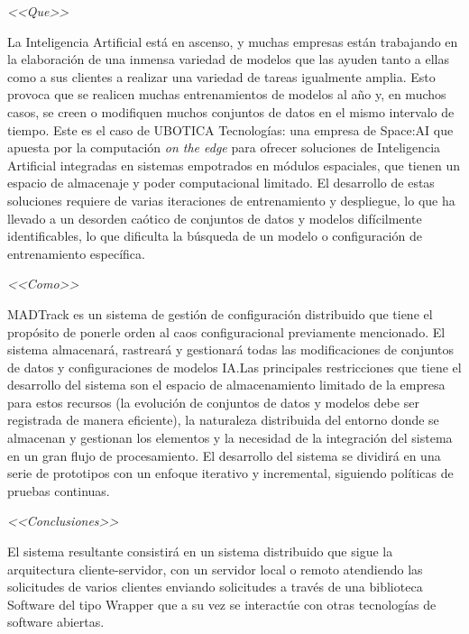 \begin{resumenPral}[spanish]{\titulo} %

\emph{<<Que>>}

La Inteligencia Artificial está en ascenso, y muchas empresas están trabajando en la elaboración de una inmensa variedad de modelos que las ayuden tanto a ellas 
como a sus clientes a realizar una variedad de tareas igualmente amplia. Esto provoca que se realicen muchas entrenamientos de modelos al año y, en muchos casos, 
se creen o modifiquen muchos conjuntos de datos en el mismo intervalo de tiempo. Este es el caso de UBOTICA Tecnologías: una empresa de Space:AI que apuesta por la
computación \emph{on the edge} para ofrecer soluciones de Inteligencia Artificial integradas en sistemas empotrados en módulos espaciales, que tienen un espacio de 
almacenaje y poder computacional limitado. El desarrollo de estas soluciones requiere de varias iteraciones de entrenamiento y despliegue, lo que ha llevado a un desorden
caótico de conjuntos de datos y modelos difícilmente identificables, lo que dificulta la búsqueda de un modelo o configuración de entrenamiento específica. 

\emph{<<Como>>}

MADTrack es un sistema de gestión de configuración distribuido que tiene el propósito de ponerle orden al caos configuracional previamente mencionado. El sistema almacenará, 
rastreará y gestionará todas las modificaciones de conjuntos de datos y configuraciones de modelos IA.Las principales
restricciones que tiene el desarrollo del sistema son el espacio de almacenamiento limitado de la empresa para estos recursos (la evolución de conjuntos de datos y modelos debe ser 
registrada de manera eficiente), la naturaleza distribuida del entorno donde se almacenan y gestionan los elementos y la necesidad de la integración del sistema en un gran flujo de
procesamiento. El desarrollo del sistema se dividirá en una serie de prototipos con un enfoque iterativo y incremental, siguiendo políticas de pruebas continuas.


\emph{<<Conclusiones>>}

El sistema resultante consistirá en un sistema distribuido que sigue la arquitectura cliente-servidor, con un servidor local o remoto atendiendo las solicitudes de varios clientes enviando 
solicitudes a través de una biblioteca Software del tipo Wrapper que a su vez se interactúe con otras tecnologías de software abiertas. 

\end{resumenPral}




